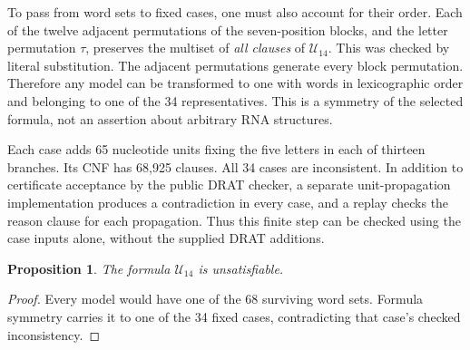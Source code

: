\documentclass[11pt,a4paper]{article}
\newtheorem{proposition}[theorem]{Proposition}
\theoremstyle{definition}
\newcommand{\U}{\mathcal U_{14}}
\begin{document}
To pass from word sets to fixed cases, one must also account for their
order. Each of the twelve adjacent permutations of the seven-position
blocks, and the letter permutation $\tau$, preserves the multiset of
\emph{all clauses} of $\U$. This was checked by literal substitution.
The adjacent permutations generate every block permutation. Therefore
any model can be transformed to one with words in lexicographic order
and belonging to one of the 34 representatives. This is a symmetry of
the selected formula, not an assertion about arbitrary RNA structures.

Each case adds 65 nucleotide units fixing the five letters in each of
thirteen branches. Its CNF has 68,925 clauses. All 34 cases are
inconsistent. In addition to certificate acceptance by the public
DRAT checker, a separate unit-propagation implementation produces a
contradiction in every case, and a replay checks the reason clause for
each propagation. Thus this finite step can be checked using the case
inputs alone, without the supplied DRAT additions.

\begin{proposition}\label{prop:u}
The formula $\U$ is unsatisfiable.
\end{proposition}
\begin{proof}
Every model would have one of the 68 surviving word sets. Formula
symmetry carries it to one of the 34 fixed cases, contradicting that
case's checked inconsistency.
\end{proof}
\end{document}
